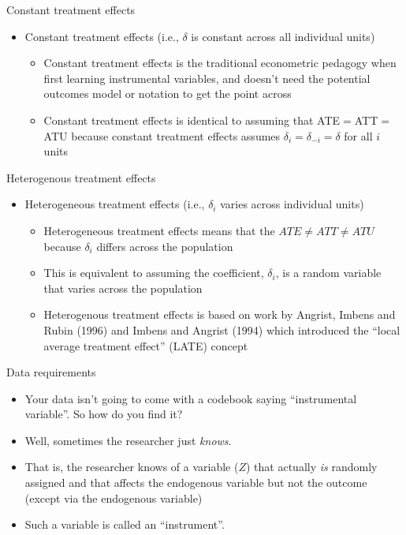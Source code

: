 \documentclass{beamer}
\begin{document}
\begin{frame}{Constant treatment effects}

		\begin{itemize}
		\item Constant treatment effects (i.e., $\delta$ is constant across all individual units)
			\begin{itemize}
			\item Constant treatment effects is the traditional econometric pedagogy when first learning instrumental variables, and doesn't need the potential outcomes model or notation to get the point across
			\item Constant treatment effects is identical to assuming that ATE$=$ATT$=$ATU because constant treatment effects assumes $\delta_i=\delta_{-i}=\delta$ for all $i$ units
			\end{itemize}
		\end{itemize}

\end{frame}


\begin{frame}{Heterogenous treatment effects}

\begin{itemize}
		\item Heterogeneous treatment effects (i.e., $\delta_i$ varies across individual units)
			\begin{itemize}
			\item Heterogeneous treatment effects means that the $ATE\neq{ATT}\neq{ATU}$ because $\delta_i$ differs across the population
			\item This is equivalent to assuming the coefficient, $\delta_i$, is a random variable that varies across the population
			\item Heterogenous treatment effects is based on work by Angrist, Imbens and Rubin (1996) and Imbens and Angrist (1994) which introduced the  ``local average treatment effect'' (LATE) concept
			\end{itemize}
\end{itemize}

\end{frame}

\begin{frame}{Data requirements}

	\begin{itemize}
	\item Your data isn't going to come with a codebook saying ``instrumental variable''.  So how do you find it?
	\item Well, sometimes the researcher just \emph{knows}.  
	\item That is, the researcher knows of a variable ($Z$) that actually \emph{is} randomly assigned and that affects the endogenous variable but not the outcome (except via the endogenous variable)  
	\item Such a variable is called an ``instrument''.
	\end{itemize}
\end{frame}
\end{document}
